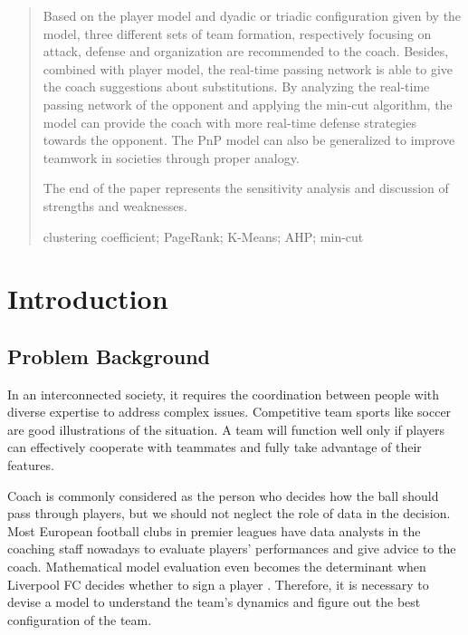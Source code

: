 \documentclass{mcmthesis}
\begin{document}
\begin{abstract}
    Based on the player model and dyadic or triadic configuration given by the model, three different sets of team formation, respectively focusing on attack, defense and organization are recommended to the coach. Besides, combined with player model, the real-time passing network is able to give the coach suggestions about substitutions. By analyzing the real-time passing network of the opponent and applying the min-cut algorithm, the model can provide the coach with more real-time defense strategies towards the opponent. The PnP model can also be generalized to improve teamwork in societies through proper analogy.

    The end of the paper represents the sensitivity analysis and discussion of strengths and weaknesses.
		\begin{keywords}
			clustering coefficient; PageRank; K-Means; AHP; min-cut
		\end{keywords}
	\end{abstract}

\maketitle

\tableofcontents

\newpage

\section{Introduction}	
\subsection{Problem Background}
In an interconnected society, it requires the coordination between people with diverse expertise to address complex issues. Competitive team sports like soccer are good illustrations of the situation. A team will function well only if players can effectively cooperate with teammates and fully take advantage of their features.

Coach is commonly considered as the person who decides how the ball should pass through players, but we should not neglect the role of data in the decision. Most European football clubs in premier leagues have data analysts in the coaching staff nowadays to evaluate players' performances and give advice to the coach. Mathematical model evaluation even becomes the determinant when Liverpool FC decides whether to sign a player \cite{Liverpool}. Therefore, it is necessary to devise a model to understand the team's dynamics and figure out the best configuration of the team.
\end{document}
